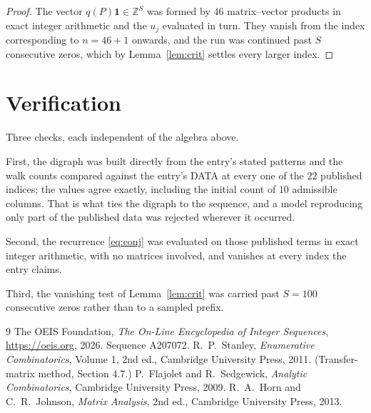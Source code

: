 \documentclass[11pt,a4paper]{article}
\theoremstyle{plain}
\theoremstyle{definition}
\begin{document}
\begin{proof}
The vector $q(P)\mathbf{1}\in\mathbb{Z}^{S}$ was formed by $46$ matrix--vector
products in exact integer arithmetic and the $u_j$ evaluated in turn. They vanish from the
index corresponding to $n=46+1$ onwards, and the run was continued past $S$ consecutive
zeros, which by Lemma~\ref{lem:crit} settles every larger index.
\end{proof}

\section{Verification}

Three checks, each independent of the algebra above.

First, the digraph was built directly from the entry's stated patterns and the walk counts
compared against the entry's DATA at every one of the $22$ published indices; the
values agree exactly, including the initial count of $10$ admissible columns. That is
what ties the digraph to the sequence, and a model reproducing only part of the published
data was rejected wherever it occurred.

Second, the recurrence \eqref{eq:conj} was evaluated on those published terms in exact
integer arithmetic, with no matrices involved, and vanishes at every index the entry claims.

Third, the vanishing test of Lemma~\ref{lem:crit} was carried past $S=100$ consecutive
zeros rather than to a sampled prefix.

\begin{thebibliography}{9}
 The OEIS Foundation, \emph{The On-Line Encyclopedia of Integer
Sequences}, \url{https://oeis.org}, 2026. Sequence A207072.
 R.~P.~Stanley, \emph{Enumerative Combinatorics}, Volume 1, 2nd ed.,
Cambridge University Press, 2011. (Transfer-matrix method, Section 4.7.)
 P.~Flajolet and R.~Sedgewick, \emph{Analytic Combinatorics}, Cambridge
University Press, 2009.
 R.~A.~Horn and C.~R.~Johnson, \emph{Matrix Analysis}, 2nd ed., Cambridge
University Press, 2013.
\end{thebibliography}
\end{document}
